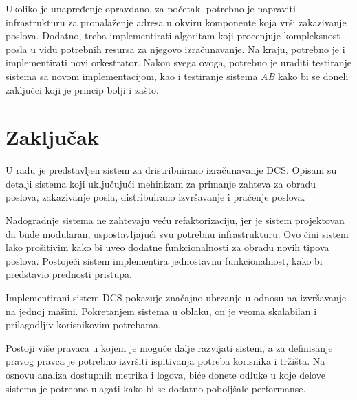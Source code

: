 \documentclass[12pt,oneside]{memoir}
\begin{document}
Ukoliko je unapređenje opravdano, za početak, potrebno je napraviti infrastrukturu za pronalaženje adresa u okviru komponente koja vrši zakazivanje poslova. Dodatno, treba implementirati algoritam koji procenjuje kompleksnost posla u vidu potrebnih resursa za njegovo izračunavanje. Na kraju, potrebno je i implementirati novi orkestrator. Nakon svega ovoga, potrebno je uraditi testiranje sistema sa novom implementacijom, kao i testiranje sistema \emph{AB} kako bi se doneli zaključci koji je princip bolji i zašto.


\section{Zaključak}
U radu je predstavljen sistem za dristribuirano izračunavanje DCS. Opisani su detalji sistema koji uključujući mehinizam za primanje zahteva za obradu poslova, zakazivanje posla, distribuirano izvršavanje i praćenje poslova.

Nadogradnje sistema ne zahtevaju veću refaktorizaciju, jer je sistem projektovan da bude modularan, uspostavljajući svu potrebnu infrastrukturu. Ovo čini sistem lako prošitivim kako bi uveo dodatne funkcionalnosti za obradu novih tipova poslova. Postojeći sistem implementira jednostavnu funkcionalnost, kako bi predstavio prednosti pristupa.

Implementirani sistem DCS pokazuje značajno ubrzanje u odnosu na izvršavanje na jednoj mašini. Pokretanjem sistema u oblaku, on je veoma skalabilan i prilagodljiv korisnikovim potrebama.

Postoji više pravaca u kojem je moguće dalje razvijati sistem, a za definisanje pravog pravca je potrebno izvršiti ispitivanja potreba korisnika i tržišta. Na osnovu analiza dostupnih metrika i logova, biće donete odluke u koje delove sistema je potrebno ulagati kako bi se dodatno poboljšale performanse.

\literatura

\backmatter
\end{document}
